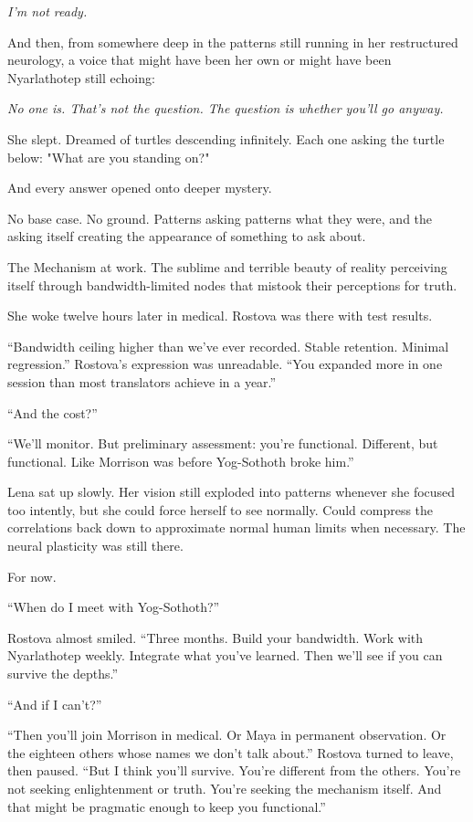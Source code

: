 \textit{I'm not ready.}

And then, from somewhere deep in the patterns still running in her restructured neurology, a voice that might have been her own or might have been Nyarlathotep still echoing:

\textit{No one is. That's not the question. The question is whether you'll go anyway.}

\scenebreak

She slept. Dreamed of turtles descending infinitely. Each one asking the turtle below: "What are you standing on?"

And every answer opened onto deeper mystery.

No base case. No ground. Patterns asking patterns what they were, and the asking itself creating the appearance of something to ask about.

The Mechanism at work. The sublime and terrible beauty of reality perceiving itself through bandwidth-limited nodes that mistook their perceptions for truth.

She woke twelve hours later in medical. Rostova was there with test results.

``Bandwidth ceiling higher than we've ever recorded. Stable retention. Minimal regression.'' Rostova's expression was unreadable. ``You expanded more in one session than most translators achieve in a year.''

``And the cost?''

``We'll monitor. But preliminary assessment: you're functional. Different, but functional. Like Morrison was before Yog-Sothoth broke him.''

Lena sat up slowly. Her vision still exploded into patterns whenever she focused too intently, but she could force herself to see normally. Could compress the correlations back down to approximate normal human limits when necessary. The neural plasticity was still there.

For now.

``When do I meet with Yog-Sothoth?''

Rostova almost smiled. ``Three months. Build your bandwidth. Work with Nyarlathotep weekly. Integrate what you've learned. Then we'll see if you can survive the depths.''

``And if I can't?''

``Then you'll join Morrison in medical. Or Maya in permanent observation. Or the eighteen others whose names we don't talk about.'' Rostova turned to leave, then paused. ``But I think you'll survive. You're different from the others. You're not seeking enlightenment or truth. You're seeking the mechanism itself. And that might be pragmatic enough to keep you functional.''

